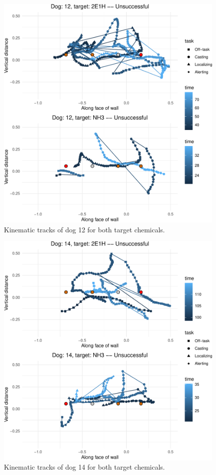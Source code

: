 \documentclass[
]{article}
\begin{document}
\begin{figure}
\centering
\includegraphics{supplementary-info_files/figure-latex/dog-12-1.pdf}
\caption{\label{fig:dog-12}Kinematic tracks of dog 12 for both target chemicals.}
\end{figure}

\begin{figure}
\centering
\includegraphics{supplementary-info_files/figure-latex/dog-14-1.pdf}
\caption{\label{fig:dog-14}Kinematic tracks of dog 14 for both target chemicals.}
\end{figure}
\end{document}
